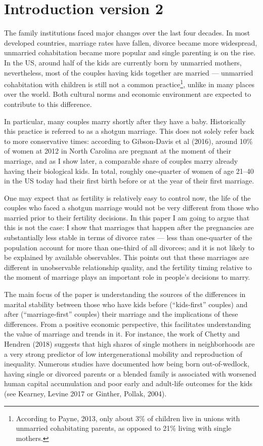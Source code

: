 \documentclass[12pt,letter]{article}
\begin{document}
\section{Introduction version 2}
The family institutions faced major changes over the last four decades. In most developed countries, marriage rates have fallen, divorce became more widespread, unmarried cohabitation became more popular and single parenting is on the rise. In the US, around half of the kids are currently born by unmarried mothers, nevertheless, most of the couples having kids together are married ---  unmarried cohabitation with children is still not a common practice\footnote{According to Payne, 2013, only about 3\% of children live in unions with unmarried cohabitating parents, as opposed to 21\% living with single mothers.}, unlike in many places over the world. Both cultural norms and economic environment are expected to contribute to this difference. 

In particular, many couples marry shortly after they have a baby.  Historically this practice is referred to as a shotgun marriage. This does not solely refer back to more conservative times: according to Gibson-Davis et al (2016), around 10\% of women at 2012 in North Carolina are pregnant at the moment of their marriage, and as I show later, a comparable share of couples marry already having their biological kids. In total, roughly one-quarter of women of age 21--40 in the US today had their first birth before or at the year of their first marriage.

One may expect that as fertility is relatively easy to control now, the life of the couples who faced a shotgun marriage would not be very different from those who married prior to their fertility decisions. In this paper I am going to argue that this is not the case: I show that marriages that happen after the pregnancies are substantially less stable in terms of divorce rates --- less than one-quarter of the population account for more than one-third of all divorces; and it is not likely to be explained by available observables. This points out that these marriages are different in unobservable relationship quality, and the fertility timing relative to the moment of marriage plays an important role in people's decisions to marry.

The main focus of the paper is understanding the sources of the differences in marital stability between those who have kids before (``kids-first'' couples) and after (``marriage-first'' couples) their marriage and the implications of these differences. From a positive economic perspective, this facilitates understanding the value of marriage and trends in it. For instance, the work of Chetty and Hendren (2018) suggests that high shares of single mothers in neighborhoods are a very strong predictor of low intergenerational mobility and reproduction of inequality. Numerous studies have documented how being born out-of-wedlock, having single or divorced parents or a blended family is associated with worsened human capital accumulation and poor early and adult-life outcomes for the kids (see Kearney, Levine 2017 or Ginther, Pollak, 2004).
\end{document}
